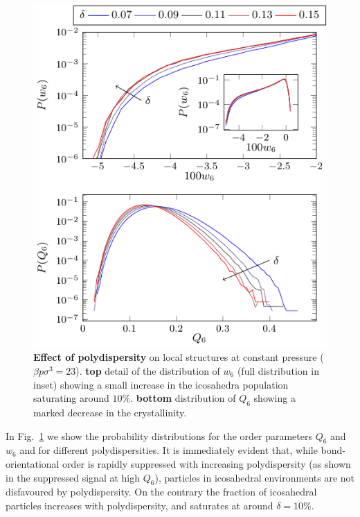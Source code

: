 \documentclass[twocolumn,superscriptaddress]{revtex4-1}
\begin{document}
\begin{figure}
 \centering
 \includegraphics{fig_polydistrib}
 \caption{\textbf{Effect of polydispersity} on local structures at constant pressure ($\beta p\sigma^3=23$). \textbf{top} detail of the distribution of $w_6$ (full distribution in inset) showing a small increase in the icosahedra population saturating around $10\%$. \textbf{bottom} distribution of $Q_6$ showing a marked decrease in the crystallinity.}
 \label{fig:polydispersity}
\end{figure}


In Fig.~\ref{fig:polydispersity} we show the probability distributions for the order
parameters $Q_6$ and $w_6$ and for different polydispersities. It is immediately
evident that, while bond-orientational order is rapidly suppressed with increasing
polydispersity (as shown in the suppressed signal at high $Q_6$), particles in icosahedral
environments are not disfavoured by polydispersity. On the contrary the fraction of
icosahedral particles increases with polydispersity, and saturates at around $\delta=10\%$.
\end{document}
